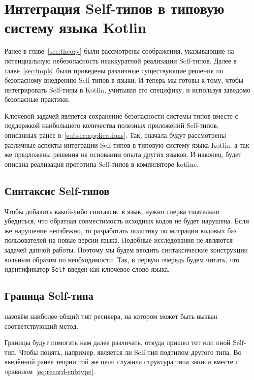 \section{Интеграция Self-типов в типовую систему языка Kotlin} \label{sec:integration}

Ранее в главе~\ref{sec:theory} были рассмотрены соображения, указывающие на потенциальную небезопасность неаккуратной реализации Self-типов.
Далее в главе~\ref{sec:impls} были приведены различные существующие решения по безопасному внедрению Self-типов в языки.
И теперь мы готовы к тому, чтобы интегрировать Self-типы в Kotlin, учитывая его специфику, и используя заведомо безопасные практики.

Ключевой задачей является сохранение безопасности системы типов вместе с поддержкой наибольшего количества полезных приложений Self-типов, описанных ранее в~\ref{subsec:applications}.
Так, сначала будут рассмотрены различные аспекты интеграции Self-типов в типовую систему языка Kotlin, а так же предложены решения на основании опыта других языков.
И наконец, будет описана реализация прототипа Self-типов в компиляторе kotlinc.


\subsection{Синтаксис Self-типов}

Чтобы добавить какой-либо синтаксис в язык, нужно сперва тщательно убедиться, что обратная совместимость исходных кодов не будет нарушена.
Если же нарушение неизбежно, то разработать политику по миграции кодовых баз пользователей на новые версии языка.
Подобные исследования не являются задачей данной работы.
Поэтому мы будем вводить синтаксические конструкции вольным образом по необходимости.
Так, в первую очередь будем читать, что идентификатор \texttt{Self} введён как ключевое слово языка.


\subsection{Граница Self-типа} \label{subsec:bound}

\begin{definition}
    \label{def:bound}
     назовём наиболее общий тип ресивера, на котором может быть вызван соответствующий метод.
\end{definition}

Границы будут помогать нам далее различать, откуда пришел тот или иной Self-тип.
Чтобы понять, например, является ли Self-тип подтипом другого типа.
Во введённой ранее теории той же цели служила структура типа записи вместе с правилом~\eqref{eq:record-subtype}.

